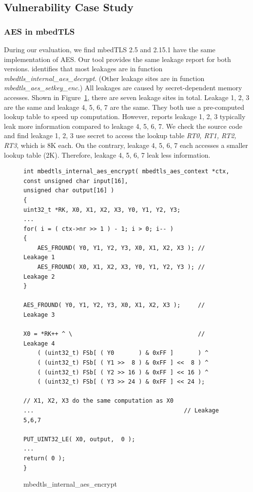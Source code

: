 \subsection{Vulnerability Case Study}\label{sec:eval_case}
\subsubsection{AES in mbedTLS}
During our evaluation, we find mbedTLS 2.5 and 2.15.1 have the same
implementation of AES\@. Our tool provides the same leakage report for both
versions. \tool{} identifies that most leakages are in function
\emph{mbedtls\_internal\_aes\_decrypt}. (Other leakage sites are in function
\emph{mbedtls\_aes\_setkey\_enc}.) All leakages are caused by secret-dependent
memory accesses. Shown in Figure~\ref{mbedtls_aes}, there are seven leakage
sites in total. Leakage 1, 2, 3 are the same and leakage 4, 5, 6, 7 are the
same. They both use a pre-computed lookup table to speed up computation.
However, \tool{} reports leakage 1, 2, 3 typically leak more information
compared to leakage 4, 5, 6, 7. We check the source code and find leakage 1, 2,
3 use secret to access the lookup table \emph{RT0, RT1, RT2, RT3}, which is 8K
each. On the contrary, leakage 4, 5, 6, 7 each accesses a smaller lookup table
(2K). Therefore, leakage 4, 5, 6, 7 leak less information.

\begin{figure}%
    \centering
    \begin{lstlisting}[xleftmargin=.02\textwidth,xrightmargin=.01\textwidth]
int mbedtls_internal_aes_encrypt( mbedtls_aes_context *ctx,
const unsigned char input[16],
unsigned char output[16] )
{
uint32_t *RK, X0, X1, X2, X3, Y0, Y1, Y2, Y3;
...
for( i = ( ctx->nr >> 1 ) - 1; i > 0; i-- )
{
    AES_FROUND( Y0, Y1, Y2, Y3, X0, X1, X2, X3 ); // Leakage 1
    AES_FROUND( X0, X1, X2, X3, Y0, Y1, Y2, Y3 ); // Leakage 2
}

AES_FROUND( Y0, Y1, Y2, Y3, X0, X1, X2, X3 );     // Leakage 3

X0 = *RK++ ^ \                                    // Leakage 4
    ( (uint32_t) FSb[ ( Y0       ) & 0xFF ]       ) ^
    ( (uint32_t) FSb[ ( Y1 >>  8 ) & 0xFF ] <<  8 ) ^
    ( (uint32_t) FSb[ ( Y2 >> 16 ) & 0xFF ] << 16 ) ^
    ( (uint32_t) FSb[ ( Y3 >> 24 ) & 0xFF ] << 24 );

// X1, X2, X3 do the same computation as X0
...                                           // Leakage 5,6,7

PUT_UINT32_LE( X0, output,  0 );
...
return( 0 );
}
\end{lstlisting}
    \caption{mbedtls\_internal\_aes\_encrypt}
    \label{mbedtls_aes}
\end{figure}

